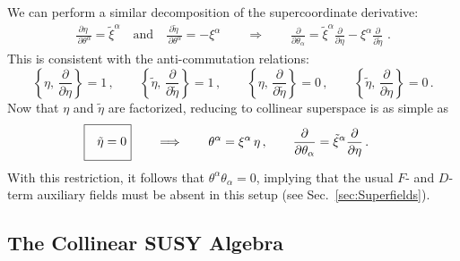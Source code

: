 \documentclass[12pt,document,nofootinbib,superscriptaddress,onecolumn,preprintnumbers,balancelastpage]{article}
\DeclareRobustCommand{\Sec}[1]{Sec.~\ref{#1}}
\begin{document}
\begin{spacing}{1.2}
We can perform a similar decomposition of the supercoordinate derivative: 
%
\begin{align}
\frac{\partial \eta\,}{\,\partial \theta^\alpha} = \tilde{\xi}^\alpha\quad \text{and} \quad \frac{\partial \tilde{\eta}\,}{\,\partial \theta^\alpha} =  - \xi^\alpha \qquad \Longrightarrow \qquad \frac{\partial}{\partial \theta_\alpha} = \tilde{\xi}^\alpha \frac{\partial}{\partial \eta} - \xi^\alpha \frac{\partial}{\partial \tilde{\eta}}\,\,.
\end{align}
%
This is consistent with the anti-commutation relations:
\begin{equation}
\left\{\eta,\, \frac{\partial}{\partial \eta}  \right\} = 1\,, \qquad \left\{\tilde{\eta},\, \frac{\partial}{\partial \tilde{\eta}}  \right\} = 1\,, \qquad \left\{\eta, \,\frac{\partial}{\partial \tilde{\eta}}  \right\} = 0\,, \qquad \left\{\tilde{\eta}, \,\frac{\partial}{\partial \eta}  \right\} = 0\, . 
\end{equation}
%
Now that $\eta$ and $\tilde{\eta}$ are factorized, reducing to collinear superspace is as simple as
\begin{align}
\Aboxed{\begin{minipage}{0.09\linewidth}\vspace{7pt}$\hspace{7pt}\tilde{\eta} = 0$\vspace{7pt}\end{minipage}} \qquad \Longrightarrow  \qquad \theta^\alpha = \xi^\alpha\, \eta\,, \qquad \frac{\partial}{\partial \theta_\alpha} =  \tilde{\xi}^\alpha \frac{\partial}{\partial \eta}\,.
\end{align}
With this restriction, it follows that $\theta^\alpha \theta_{\alpha} = 0$, implying that the usual $F$- and $D$-term auxiliary fields must be absent in this setup (see \Sec{sec:Superfields}). 

\subsection{The Collinear SUSY Algebra}


\end{spacing}
\end{document}
